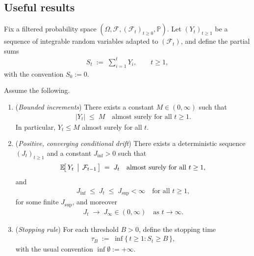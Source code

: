 \subsection{Useful results}

\begin{theorem}
\label{thm:dynamic-hitting-time}
Fix a filtered probability space $(\Omega,\mathcal{F},(\mathcal{F}_t)_{t\geq 0},\mathbb{P})$.
Let $(Y_t)_{t\geq 1}$ be a sequence of integrable random variables adapted to $(\mathcal{F}_t)$, and define the partial sums
\begin{align*}
S_t \;:=\; \sum_{i=1}^t Y_i, \qquad t\geq 1,
\end{align*}
with the convention $S_0:=0$.

Assume the following.

\begin{enumerate}
  \item[(A1)] (\emph{Bounded increments}) There exists a constant $M\in(0,\infty)$ such that
  \begin{align*}
    |Y_t|\;\leq\; M \quad \text{almost surely for all } t\geq 1.
  \end{align*}
  In particular, $Y_t \leq M$ almost surely for all $t$.

  \item[(A2)] (\emph{Positive, converging conditional drift}) There exists a deterministic sequence $(J_t)_{t\geq 1}$ and a constant $J_{\inf}>0$ such that
  \begin{align*}
    \mathbb{E}\!\bigl[\,Y_t \,\bigm|\, \mathcal{F}_{t-1}\,\bigr] \;=\; J_t
    \quad\text{almost surely for all } t\geq 1,
  \end{align*}
  and
  \begin{align*}
    J_{\inf} \;\leq\; J_t \;\leq\; J_{\sup} < \infty
    \quad\text{for all } t\geq 1,
  \end{align*}
  for some finite $J_{\sup}$, and moreover
  \begin{align*}
    J_t \;\longrightarrow\; J_\infty \in (0,\infty)
    \quad\text{as } t\to\infty.
  \end{align*}

  \item[(A3)] (\emph{Stopping rule}) For each threshold $B>0$, define the stopping time
  \begin{align*}
    \tau_B \;:=\; \inf\{\,t\geq 1 : S_t \geq B\,\},
  \end{align*}
  with the usual convention $\inf\emptyset := +\infty$.
\end{enumerate}


\end{theorem}
